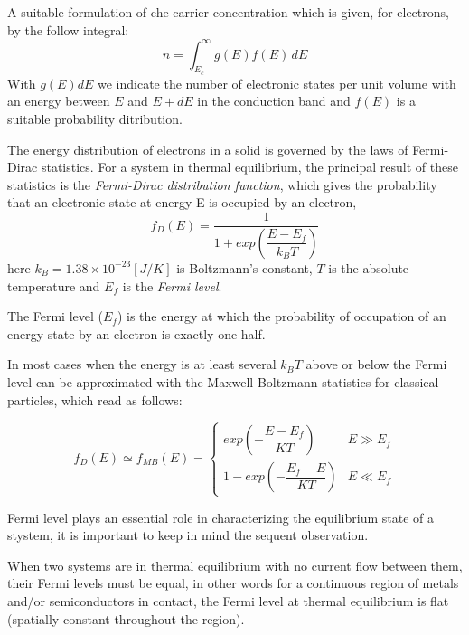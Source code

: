 A suitable formulation of che carrier concentration which is given, for electrons, by the follow integral:
\begin{equation}
\label{eq: carrier densiy integral}
n = \int_{E_c}^\infty g(E)f(E) \, dE
\end{equation}
With $g(E)dE$ we indicate the number of electronic states per unit volume with an energy between $E$ and $E+dE$ in the conduction band and $f(E)$ is a suitable probability ditribution.

The energy distribution of electrons in a solid is governed by the laws of Fermi-Dirac statistics. For a system in thermal equilibrium, the principal result of these statistics is the \textit{Fermi-Dirac distribution function}, which gives the probability that an electronic state at energy E is occupied by an electron,
\begin{equation}
\label{eq: fermi dirac distribution}
f_D(E) = \dfrac{1}{1+exp\left(\dfrac{E-E_f}{k_BT}\right)} 
\end{equation}
here $k_B=1.38\times10^{-23}[J/K]$ is Boltzmann's constant, $T$ is the absolute temperature and $E_f$ is the \textit{Fermi level}.

\begin{Definizione}
The Fermi level ($E_f$) is the energy at which the probability of occupation of an energy state by an electron is exactly one-half.
\end{Definizione}

In most cases when the energy is at least several $k_BT$ above or below the Fermi level  can be approximated with the Maxwell-Boltzmann statistics for classical particles, which read as follows:

\begin{equation}
\label{eq: maxwell distribution}
f_D(E)\simeq f_{MB}(E) = 
\begin{cases}
exp\left(-\dfrac{E-E_f}{KT}\right) & E\gg E_f \\
1-exp\left(-\dfrac{E_f-E}{KT}\right) & E \ll E_f
\end{cases}
\end{equation}

Fermi level plays an essential role in characterizing the equilibrium state of a stystem, it is important to keep in mind the sequent observation.

\begin{Osservazione}
When two systems are in thermal equilibrium with no current flow between them, their Fermi levels must be equal, in other words for a continuous region of metals and/or semiconductors in contact, the Fermi level at thermal equilibrium is flat (spatially constant throughout the region).
\end{Osservazione}

